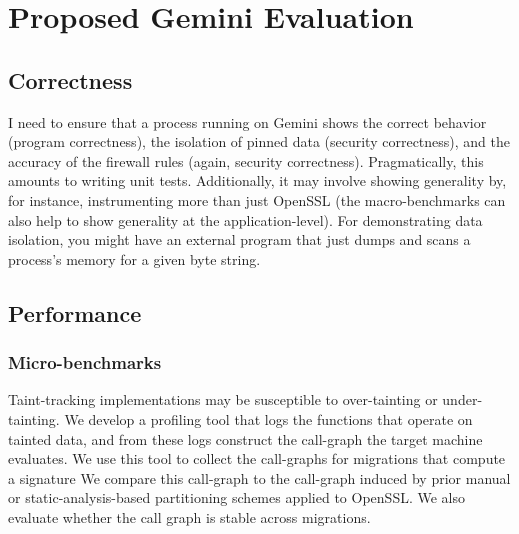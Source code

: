 \section{Proposed Gemini Evaluation}
\label{sec:gemini-eval}
%


\subsection{Correctness}
%
I need to ensure that a process running on Gemini shows the correct behavior
(program correctness), the isolation of pinned data (security correctness), and
the accuracy of the firewall rules (again, security correctness).
%
Pragmatically, this amounts to writing unit tests.
%
Additionally, it may involve showing generality by, for instance, instrumenting
more than just OpenSSL (the macro-benchmarks can also help to show generality
at the application-level).
%
For demonstrating data isolation, you might have an external program that just
dumps and scans a process's memory for a given byte string.






\subsection{Performance}

\subsubsection{Micro-benchmarks}

%
Taint-tracking implementations may be susceptible to over-tainting or
under-tainting.
%
We develop a profiling tool that logs the functions that operate on
tainted data, and from these logs construct the call-graph the target machine
evaluates.
%
We use this tool to collect the call-graphs for migrations that compute a
signature
%
We compare this call-graph to the call-graph induced by prior manual or
static-analysis-based partitioning schemes applied to OpenSSL\@.
%
We also evaluate whether the call graph is stable across migrations.


